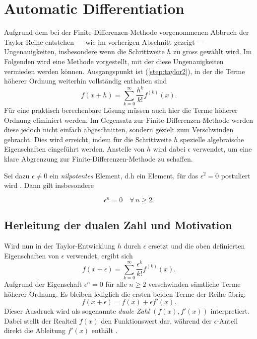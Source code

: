%
%
%
%
\section{Automatic Differentiation
\label{step:section:teil1}}
%

Aufgrund dem bei der Finite-Differenzen-Methode vorgenommenen Abbruch der Taylor-Reihe entstehen --- wie im vorherigen Abschnitt gezeigt --- Ungenauigkeiten, insbesondere wenn die Schrittweite $h$ zu gross gewählt wird.  
Im Folgenden wird eine Methode vorgestellt, mit der diese Ungenauigkeiten vermieden werden können. Ausgangspunkt ist (\ref{step:taylor2}), in der die Terme höherer Ordnung weiterhin vollständig enthalten sind
\begin{equation*}
	f(x+h) = \sum_{k=0}^{\infty} \frac{h^k}{k!} f^{(k)}(x).
\end{equation*}
Für eine praktisch berechenbare Lösung müssen auch hier die Terme höherer Ordnung eliminiert werden. Im Gegensatz zur Finite-Differenzen-Methode werden diese jedoch nicht einfach abgeschnitten, sondern gezielt zum Verschwinden gebracht.  
Dies wird erreicht, indem für die Schrittweite $h$ spezielle algebraische Eigenschaften eingeführt werden. Anstelle von $h$ wird dabei $\epsilon$ verwendet, um eine klare Abgrenzung zur Finite-Differenzen-Methode zu schaffen.

Sei dazu $\epsilon \neq 0$ ein \emph{nilpotentes} Element, d.h ein Element, für das $\epsilon^2 = 0$ postuliert wird \cite{step:baydin2018}. Dann gilt insbesondere
%
%

\begin{equation*}
	\epsilon^n = 0 \quad \forall\, n \geq 2.
\end{equation*}

\subsection{Herleitung der dualen Zahl und Motivation}

Wird nun in der Taylor-Entwicklung $h$ durch $\epsilon$ ersetzt und die oben definierten Eigenschaften von $\epsilon$ verwendet, ergibt sich
\begin{equation}
	f(x+\epsilon) = \sum_{k=0}^{\infty} \frac{\epsilon^k}{k!} f^{(k)}(x).
		\label{step:taylorepsilon}
\end{equation}
Aufgrund der Eigenschaft $\epsilon^n = 0$ für alle $n \geq 2$ verschwinden sämtliche Terme höherer Ordnung. Es bleiben lediglich die ersten beiden Terme der Reihe übrig:
\begin{equation}
	f(x+\epsilon) = f(x) + \epsilon f'(x).
		\label{step:autodiffdual}
\end{equation}
Dieser Ausdruck wird als sogenannte \emph{duale Zahl} $\left(f\left(x\right), f'\left(x\right)\right)$ interpretiert. Dabei stellt der Realteil $f(x)$ den Funktionswert dar, während der $\epsilon$-Anteil direkt die Ableitung $f'(x)$ enthält \cite{step:baydin2018}. 
%

